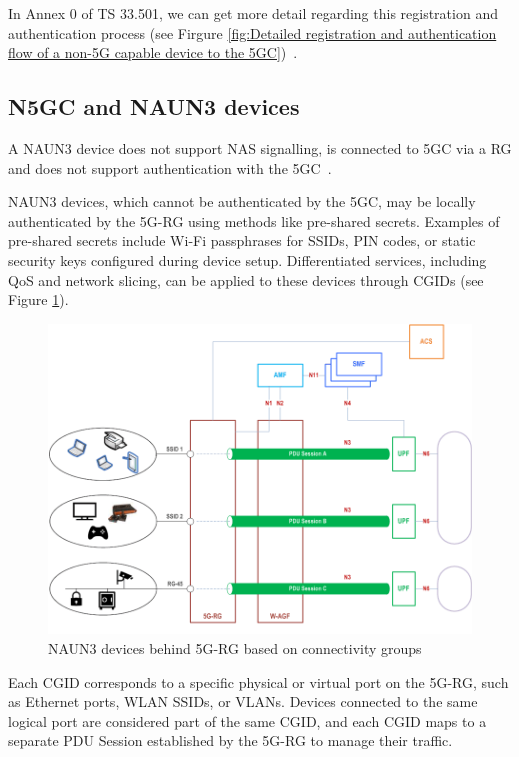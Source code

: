 In Annex 0 of TS 33.501, we can get more detail regarding this registration and authentication process (see Firgure \ref{fig:Detailed registration and authentication flow of a non-5G capable device to the 5GC})~\cite{33.501-p279}.

\subsection{\ac{N5GC} and \acs{NAUN3} devices}

A \acf{NAUN3} device does not support \ac{NAS} signalling, is connected to \ac{5GC} via a \ac{RG} and does not support authentication with the \ac{5GC}~\cite{23.316-p10}.

\ac{NAUN3} devices, which cannot be authenticated by the \ac{5GC}, may be locally authenticated by the \ac{5G-RG} using methods like pre-shared secrets. Examples of pre-shared secrets include Wi-Fi passphrases for \acp{SSID}, \ac{PIN} codes, or static security keys configured during device setup. Differentiated services, including \ac{QoS} and network slicing, can be applied to these devices through \acp{CGID} (see Figure \ref{fig:NAUN3 devices behind 5G-RG based on connectivity groups}).

\begin{figure}
    \centering
    \includegraphics[width=0.75\linewidth]{figs/NAUN3 devices behind 5G-RG based on connectivity groups.png}
    \caption{NAUN3 devices behind \ac{5G-RG} based on connectivity groups}
    \label{fig:NAUN3 devices behind 5G-RG based on connectivity groups}
\end{figure}

Each \ac{CGID} corresponds to a specific physical or virtual port on the \ac{5G-RG}, such as Ethernet ports, \ac{WLAN} \acp{SSID}, or \acp{VLAN}. Devices connected to the same logical port are considered part of the same \ac{CGID}, and each \ac{CGID} maps to a separate \ac{PDU} Session established by the \ac{5G-RG} to manage their traffic.

